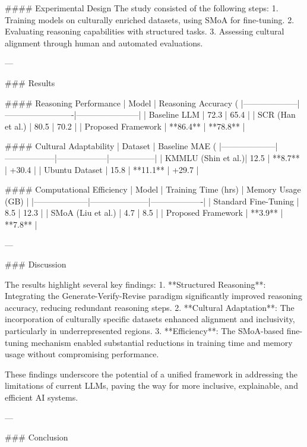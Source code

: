 #### Experimental Design
The study consisted of the following steps:
1. Training models on culturally enriched datasets, using SMoA for fine-tuning.
2. Evaluating reasoning capabilities with structured tasks.
3. Assessing cultural alignment through human and automated evaluations.

---

### Results

#### Reasoning Performance
| Model             | Reasoning Accuracy (%
|--------------------|-------------------------|-----------------------|
| Baseline LLM       | 72.3                   | 65.4                  |
| SCR (Han et al.)   | 80.5                   | 70.2                  |
| Proposed Framework | **86.4**               | **78.8**              |

#### Cultural Adaptability
| Dataset            | Baseline MAE (%
|--------------------|------------------|------------------|-----------------|
| KMMLU (Shin et al.)| 12.5             | **8.7**          | +30.4           |
| Ubuntu Dataset     | 15.8             | **11.1**         | +29.7           |

#### Computational Efficiency
| Model             | Training Time (hrs) | Memory Usage (GB) |
|--------------------|---------------------|-------------------|
| Standard Fine-Tuning | 8.5                 | 12.3              |
| SMoA (Liu et al.)    | 4.7                 | 8.5               |
| Proposed Framework   | **3.9**             | **7.8**           |

---

### Discussion

The results highlight several key findings:
1. **Structured Reasoning**: Integrating the Generate-Verify-Revise paradigm significantly improved reasoning accuracy, reducing redundant reasoning steps.
2. **Cultural Adaptation**: The incorporation of culturally specific datasets enhanced alignment and inclusivity, particularly in underrepresented regions.
3. **Efficiency**: The SMoA-based fine-tuning mechanism enabled substantial reductions in training time and memory usage without compromising performance.

These findings underscore the potential of a unified framework in addressing the limitations of current LLMs, paving the way for more inclusive, explainable, and efficient AI systems.

---

### Conclusion

